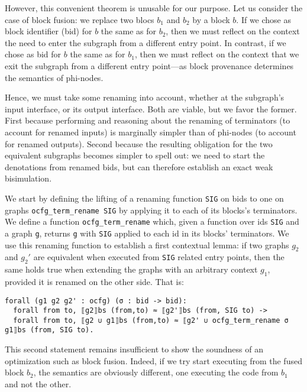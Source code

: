 \documentclass[11pt]{article}
\newcommand{\inlinecoq}[1]{\mbox{\lstinline[style=customcoq,columns=fixed,basewidth=.48em]{#1}}}
\newcommand{\ilc}[1]{\inlinecoq{#1}}
\newcommand{\yzt}[1]{\textcolor{ForestGreen!50}{#1}}
\begin{document}
\yzt{However, this convenient theorem is unusable for our purpose. Let us consider the case of block fusion: we replace two blocs $b_1$ and $b_2$ by a block $b$.
If we chose as block identifier (bid) for $b$ the same as for $b_2$, then we must reflect on the context the need to enter the subgraph from a different entry point.
In contrast, if we chose as bid for $b$ the same as for $b_1$, then we must reflect on the context that we exit the subgraph from a different entry point---as block provenance determines the semantics of phi-nodes.}

\yzt{Hence, we must take some renaming into account, whether at the subgraph's input interface, or its output interface. Both are viable, but we favor the former. First because performing and reasoning about the renaming of terminators (to account for renamed inputs) is marginally simpler than of phi-nodes (to account for renamed outputs). Second because the resulting obligation for the two equivalent subgraphs becomes simpler to spell out: we need to start the denotations from renamed bids, but can therefore establish an exact weak bisimulation.}

We start by defining the lifting of a renaming function \ilc{SIG} on bids to one on graphs \ilc{ocfg_term_rename SIG} by applying it to each of its blocks's terminators.
We define a function \ilc{ocfg_term_rename} which, given a function over ids \ilc{SIG} and a graph \ilc{g}, returns \ilc{g} with \ilc{SIG} applied to each id in its blocks' terminators.
We use this renaming function to establish a first contextual lemma: if two graphs $g_2$ and $g_2'$ are equivalent when executed from \ilc{SIG} related entry points, then the same holds true when extending the graphs with an arbitrary context $g_1$, provided it is renamed on the other side. That is:
  \begin{lstlisting}[style=customcoq,basicstyle=\small\ttfamily]
forall (g1 g2 g2' : ocfg) (σ : bid -> bid):
  forall from to, ⟦g2⟧bs (from,to) ≈ ⟦g2'⟧bs (from, SIG to) ->
  forall from to, ⟦g2 ∪ g1⟧bs (from,to) ≈ ⟦g2' ∪ ocfg_term_rename σ g1⟧bs (from, SIG to).
  \end{lstlisting}

This second statement remains insufficient to show the soundness of an optimization such as block fusion. Indeed, if we try start executing from the fused block $b_2$, the semantics are obviously different, one executing the code from $b_1$ and not the other.
\end{document}
